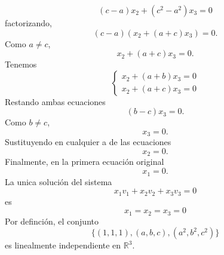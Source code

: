 \documentclass[12pt,a4paper]{article}
\begin{document}
\begin{solucion}
\begin{equation*}
            (c-a)x_{2}+(c^{2}-a^{2})x_{3}=0
        \end{equation*}
        factorizando,
        \begin{equation*}
            (c-a)(x_{2}+(a+c)x_{3})=0.
        \end{equation*}
        Como $a\neq c$,
        \begin{equation*}
            x_{2}+(a+c)x_{3}=0.
        \end{equation*}
        Tenemos
        \begin{equation*}
            \begin{cases}
                x_{2}+(a+b)x_{3}=0\\
                x_{2}+(a+c)x_{3}=0
            \end{cases}
        \end{equation*}
        Restando ambas ecuaciones
        \begin{equation*}
            (b-c)x_{3}=0.
        \end{equation*}
        Como $b\neq c$,
        \begin{equation*}
            x_{3}=0.
        \end{equation*}
        Sustituyendo en cualquier a de las ecuaciones
        \begin{equation*}
            x_{2}=0.
        \end{equation*}
        Finalmente, en la primera ecuación original
        \begin{equation*}
            x_{1}=0.
        \end{equation*}
        La unica solución del sistema
        \begin{equation*}
            x_{1}v_{1}+x_{2}v_{2}+x_{3}v_{3}=0
        \end{equation*}
        es
        \begin{equation*}
            x_{1}=x_{2}=x_{3}=0
        \end{equation*}
        Por definción, el conjunto
        \begin{equation*}
            \{(1,1,1),(a,b,c),(a^{2},b^{2},c^{2})\}
        \end{equation*}
        es linealmente independiente en $\mathbb{R}^{3}$.
    \end{solucion}
\end{document}
